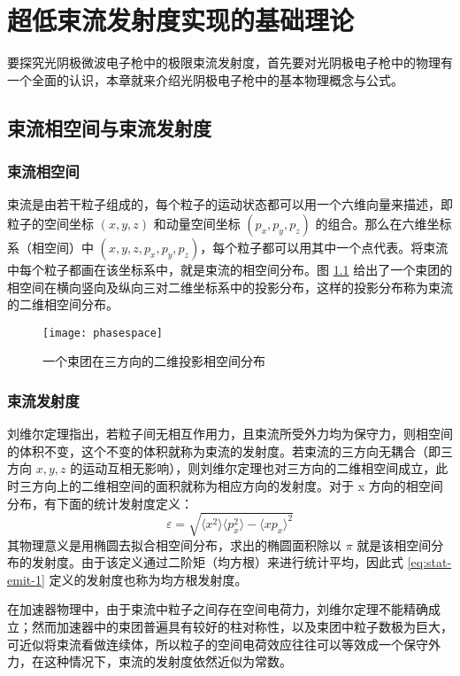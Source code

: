 \chapter{超低束流发射度实现的基础理论}
\label{chap:theory}

要探究光阴极微波电子枪中的极限束流发射度，首先要对光阴极电子枪中的物理有一个全面的认识，本章就来介绍光阴极电子枪中的基本物理概念与公式。

\section{束流相空间与束流发射度}
\subsection{束流相空间}
束流是由若干粒子组成的，每个粒子的运动状态都可以用一个六维向量来描述，即粒子的空间坐标 $(x, y, z)$ 和动量空间坐标 $(p_x, p_y, p_z)$ 的组合。那么在六维坐标系（相空间）中 $(x, y, z, p_x, p_y, p_z)$，每个粒子都可以用其中一个点代表。将束流中每个粒子都画在该坐标系中，就是束流的相空间分布。图 \ref{fig:phase-space} 给出了一个束团的相空间在横向竖向及纵向三对二维坐标系中的投影分布，这样的投影分布称为束流的二维相空间分布。
\begin{figure}[htbp]
\centering
\texttt{[image: phasespace]}
\caption{\label{fig:phase-space} 一个束团在三方向的二维投影相空间分布\cite{yaramyshev2012new}}
\end{figure}

\subsection{束流发射度}
刘维尔定理指出，若粒子间无相互作用力，且束流所受外力均为保守力，则相空间的体积不变，这个不变的体积就称为束流的发射度。若束流的三方向无耦合（即三方向 $x, y, z$ 的运动互相无影响），则刘维尔定理也对三方向的二维相空间成立，此时三方向上的二维相空间的面积就称为相应方向的发射度。对于 x 方向的相空间分布，有下面的统计发射度定义：
\begin{equation}
\varepsilon = \sqrt{\langle x^2\rangle\langle p_x^2\rangle-\langle xp_x\rangle^2}
\label{eq:stat-emit-1}
\end{equation}
其物理意义是用椭圆去拟合相空间分布，求出的椭圆面积除以 $\pi$ 就是该相空间分布的发射度。由于该定义通过二阶矩（均方根）来进行统计平均，因此式 \ref{eq:stat-emit-1} 定义的发射度也称为均方根发射度。

在加速器物理中，由于束流中粒子之间存在空间电荷力，刘维尔定理不能精确成立；然而加速器中的束团普遍具有较好的柱对称性，以及束团中粒子数极为巨大，可近似将束流看做连续体，所以粒子的空间电荷效应往往可以等效成一个保守外力，在这种情况下，束流的发射度依然近似为常数。

